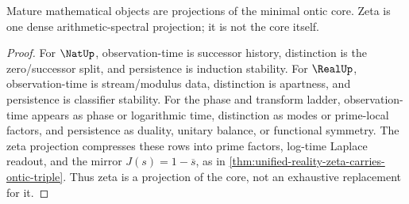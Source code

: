 \begin{theorem}
\label{thm:unified-reality-ontic-core-projection-principle}
Mature mathematical objects are projections of the minimal ontic core.
Zeta is one dense arithmetic-spectral projection; it is not the core
itself.
\end{theorem}

\begin{proof}
For $\NatUp$, observation-time is successor history, distinction is the
zero/successor split, and persistence is induction stability. For
$\RealUp$, observation-time is stream/modulus data, distinction is
apartness, and persistence is classifier stability. For the phase and
transform ladder, observation-time appears as phase or logarithmic
time, distinction as modes or prime-local factors, and persistence as
duality, unitary balance, or functional symmetry. The zeta projection
compresses these rows into prime factors, log-time Laplace readout, and
the mirror $J(s)=1-\overline{s}$, as in
\autoref{thm:unified-reality-zeta-carries-ontic-triple}. Thus zeta is a
projection of the core, not an exhaustive replacement for it.
\end{proof}
